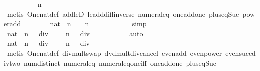 \begin{isabellebody}
\ \ \ \ \ \ \ \ \isamarkupfalse%
\ {\isacharbackquoteopen}n\ {\isasymge}\ {}{\isacharbackquoteclose}\isanewline
\ \ \ \ \ \ \ \ \isamarkupfalse%
\ {\isacharparenleft}metis\ One{\isacharunderscore}nat{\isacharunderscore}def\ add{\isacharunderscore}leD{}\ le{\isacharunderscore}add{\isacharunderscore}diff{\isacharunderscore}inverse\ numeral{\isacharunderscore}{}{\isacharunderscore}eq{\isacharunderscore}{}\ one{\isacharunderscore}add{\isacharunderscore}one\ plus{\isacharunderscore}{}{\isacharunderscore}eq{\isacharunderscore}Suc\ power{\isacharunderscore}add{\isacharparenright}\isanewline
\ \ \ \ \ \ \isamarkupfalse%
\ {\isachardoublequoteopen}{\isacharparenleft}{}{\isacharcolon}{\isacharcolon}nat{\isacharparenright}\ {\isacharcircum}\ n\ {\isacharplus}\ {}\ {\isacharequal}\ {}{\isacharasterisk}{\isacharparenleft}{}{\isacharcircum}{\isacharparenleft}n{\isacharminus}{}{\isacharparenright}\ {\isacharplus}\ {}{\isacharparenright}{\isachardoublequoteclose}\isanewline
\ \ \ \ \ \ \ \ \isamarkupfalse%
\ simp\isanewline
\ \ \ \ \ \ \isamarkupfalse%
\ {\isachardoublequoteopen}{\isacharparenleft}{\isacharparenleft}{}{\isacharcolon}{\isacharcolon}nat{\isacharparenright}\ {\isacharcircum}\ n\ {\isacharplus}\ {}{\isacharparenright}\ div\ {}\ {\isacharequal}\ {\isacharparenleft}{}\ {\isacharasterisk}\ {\isacharparenleft}{}{\isacharcircum}{\isacharparenleft}n{\isacharminus}{}{\isacharparenright}\ {\isacharplus}\ {}{\isacharparenright}{\isacharparenright}\ div\ {}{\isachardoublequoteclose}\isanewline
\ \ \ \ \ \ \ \ \isamarkupfalse%
\ auto\isanewline
\ \ \ \ \ \ \isamarkupfalse%
\ {\isachardoublequoteopen}{\isacharparenleft}{\isacharparenleft}{}{\isacharcolon}{\isacharcolon}nat{\isacharparenright}\ {\isacharcircum}\ n\ {\isacharplus}\ {}{\isacharparenright}\ div\ {}\ {\isacharequal}\ {}\ {\isacharasterisk}\ {\isacharparenleft}{\isacharparenleft}{}{\isacharcircum}{\isacharparenleft}n{\isacharminus}{}{\isacharparenright}\ {\isacharplus}\ {}{\isacharparenright}\ div\ {}{\isacharparenright}{\isachardoublequoteclose}\isanewline
\ \ \ \ \ \ \ \ \isamarkupfalse%
\ {\isacharparenleft}metis\ One{\isacharunderscore}nat{\isacharunderscore}def\ div{\isacharunderscore}mult{\isacharunderscore}swap\ dvd{\isacharunderscore}mult{\isacharunderscore}div{\isacharunderscore}cancel\ even{\isacharunderscore}add\ even{\isacharunderscore}power\ even{\isacharunderscore}succ{\isacharunderscore}div{\isacharunderscore}two\ num{\isachardot}distinct{\isacharparenleft}{}{\isacharparenright}\ numeral{\isacharunderscore}{}{\isacharunderscore}eq{\isacharunderscore}{}\ numeral{\isacharunderscore}eq{\isacharunderscore}one{\isacharunderscore}iff\ one{\isacharunderscore}add{\isacharunderscore}one\ plus{\isacharunderscore}{}{\isacharunderscore}eq{\isacharunderscore}Suc{\isacharparenright}\isanewline

\end{isabellebody}
